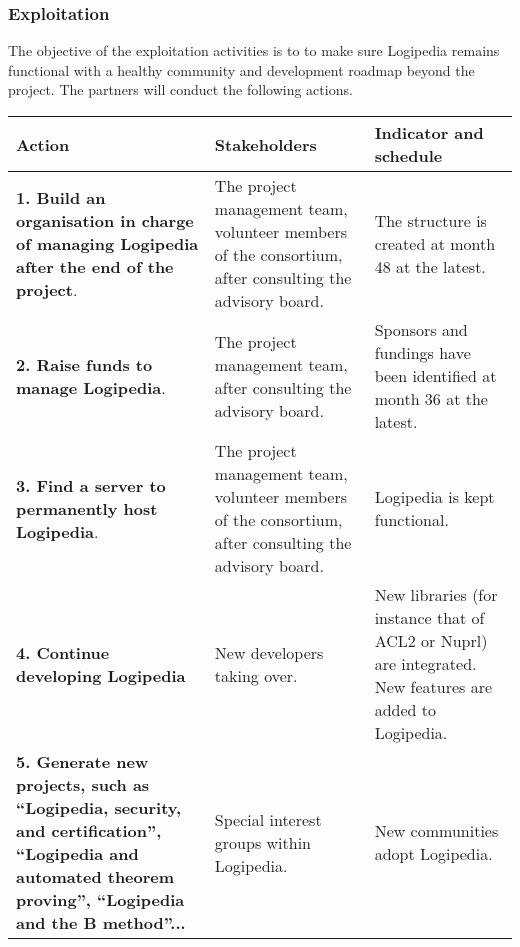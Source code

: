 \subsubsection*{Exploitation}

The objective of the exploitation activities is to
to make sure Logipedia remains functional with a
healthy community and development roadmap beyond the project.
The partners will conduct the following actions.

\begin{longtable*}{|p{0.30\textwidth}|p{0.30\textwidth}|p{0.30\textwidth}|}
\hline
{\bf Action}
&
{\bf Stakeholders}
&
{\bf Indicator and schedule}
\\
\hline
{\bf 1. Build an organisation in charge of managing Logipedia
after the end of the project}.
&
The project management team, volunteer members of the consortium,
after consulting the advisory board.
&
The structure is created at month 48 at the latest.
\\
\hline
{\bf 2. Raise funds to manage Logipedia}.
&
The project management team, after consulting the advisory board.
&
Sponsors and fundings have been identified at month 36 at the latest.
\\
\hline   
{\bf 3. Find a server to permanently host Logipedia}.
&
The project management team, volunteer members of the consortium,
after consulting the advisory board.
&
Logipedia is kept functional.
\\
\hline
{\bf 4. Continue developing Logipedia}
&
New developers taking over.
&
New libraries (for instance that of ACL2 or Nuprl) are integrated.
New features are added to Logipedia.
\\
\hline
{\bf 5. Generate new projects, such as ``Logipedia, security, and
certification'', ``Logipedia and automated theorem proving'',
``Logipedia and the B method''...}
&
Special interest groups within Logipedia. 
&
New communities adopt Logipedia.
\\
\hline
\end{longtable*}

